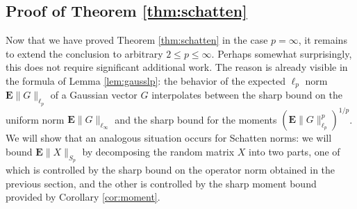 \documentclass[10pt,reqno]{amsart}
\theoremstyle{definition}
\numberwithin{equation}{section}
\numberwithin{figure}{section}
\numberwithin{table}{section}
\begin{document}
\subsection{Proof of Theorem \ref{thm:schatten}}

Now that we have proved Theorem \ref{thm:schatten} in the case $p=\infty$, 
it remains to extend the conclusion to arbitrary $2\le p\le\infty$. 
Perhaps somewhat surprisingly, this does not require significant 
additional work. The reason is already visible in the formula of Lemma 
\ref{lem:gausslp}: the behavior of the expected $\ell_p$ norm 
$\mathbf{E}\|G\|_{\ell_p}$ of a Gaussian vector $G$ interpolates between 
the sharp bound on the uniform norm $\mathbf{E}\|G\|_{\ell_\infty}$ and 
the sharp bound for the moments $(\mathbf{E}\|G\|_{\ell_p}^p)^{1/p}$. We 
will show that an analogous situation occurs for Schatten norms: we will 
bound $\mathbf{E}\|X\|_{S_p}$ by decomposing the random matrix $X$ into 
two parts, one of which is controlled by the sharp bound on the 
operator norm obtained in the previous section, and the other is 
controlled by the sharp moment bound provided by Corollary 
\ref{cor:moment}.
\end{document}
